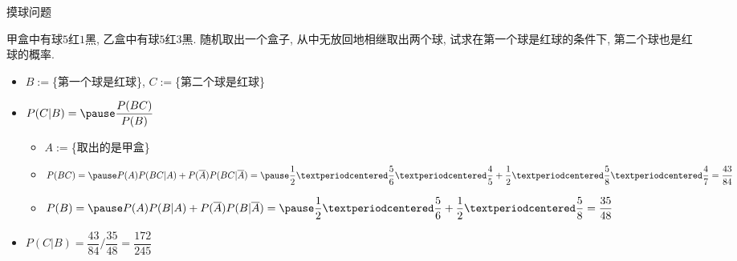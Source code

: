 \documentclass[Prob-All.tex]{subfiles}
\begin{document}
\begin{frame}{摸球问题}
	\begin{exam}
		甲盒中有球$5$红$1$黑, 乙盒中有球$5$红$3$黑. 随机取出一个盒子, 从中无放回地相继取出两个球, 试求在第一个球是红球的条件下, 第二个球也是红球的概率.
	\end{exam}
	\pause

	\begin{jieda}
		\begin{itemize}[<+-|alert@+>]
			\item $B:=$\{第一个球是红球\}, $C:=$\{第二个球是红球\}
			\item $P(C|B)=\pause \dfrac{P(BC)}{P(B)}$ \pause
			\begin{itemize}[<+-|alert@+>]
				\item $A:=$\{取出的是甲盒\}
				\item $P(BC)=\pause P(A)P(BC|A)+P(\overline{A})P(BC|\overline{A})=\pause \dfrac{1}{2}·\dfrac{5}{6}·\dfrac{4}{5}+\dfrac{1}{2}·\dfrac{5}{8}·\dfrac{4}{7}=\dfrac{43}{84}$


				\item $P(B)=\pause P(A)P(B|A)+P(\overline{A})P(B|\overline{A})=\pause \dfrac{1}{2}·\dfrac{5}{6}+\dfrac{1}{2}·\dfrac{5}{8}=\dfrac{35}{48}$%
			\end{itemize}
			\item $P(C|B)=\dfrac{43}{84}/\dfrac{35}{48}=\dfrac{172}{245}$
		\end{itemize}

	\end{jieda}
\end{frame}
\end{document}
